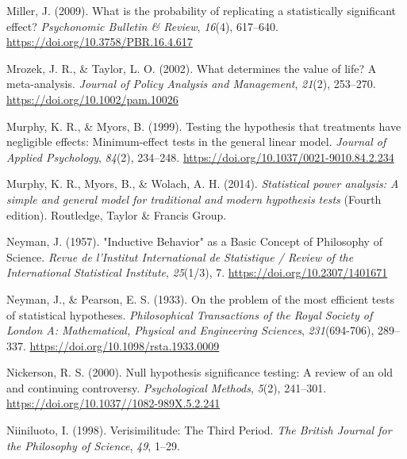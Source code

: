 \documentclass[
  letterpaper,
  DIV=11,
  numbers=noendperiod]{scrreprt}
\newlength{\cslhangindent}
\newlength{\cslentryspacingunit} %
\newenvironment{CSLReferences}[2] %
 {%
  \setlength{\parindent}{0pt}
  \ifodd #1
  \let\oldpar\par
  \def\par{\hangindent=\cslhangindent\oldpar}
  \fi
  \setlength{\parskip}{#2\cslentryspacingunit}
 }%
 {}
\begin{document}
\begin{CSLReferences}{1}{0}
\leavevmode{}%
Miller, J. (2009). What is the probability of replicating a
statistically significant effect? \emph{Psychonomic Bulletin \& Review},
\emph{16}(4), 617--640. \url{https://doi.org/10.3758/PBR.16.4.617}

\leavevmode{}%
Mrozek, J. R., \& Taylor, L. O. (2002). What determines the value of
life? A meta-analysis. \emph{Journal of Policy Analysis and Management},
\emph{21}(2), 253--270. \url{https://doi.org/10.1002/pam.10026}

\leavevmode{}%
Murphy, K. R., \& Myors, B. (1999). Testing the hypothesis that
treatments have negligible effects: {Minimum-effect} tests in the
general linear model. \emph{Journal of Applied Psychology},
\emph{84}(2), 234--248. \url{https://doi.org/10.1037/0021-9010.84.2.234}

\leavevmode{}%
Murphy, K. R., Myors, B., \& Wolach, A. H. (2014). \emph{Statistical
power analysis: A simple and general model for traditional and modern
hypothesis tests} (Fourth edition). {Routledge, Taylor \& Francis
Group}.

\leavevmode{}%
Neyman, J. (1957). "{Inductive Behavior}" as a {Basic Concept} of
{Philosophy} of {Science}. \emph{Revue de l'Institut International de
Statistique / Review of the International Statistical Institute},
\emph{25}(1/3), 7. \url{https://doi.org/10.2307/1401671}

\leavevmode{}%
Neyman, J., \& Pearson, E. S. (1933). On the problem of the most
efficient tests of statistical hypotheses. \emph{Philosophical
Transactions of the Royal Society of London A: Mathematical, Physical
and Engineering Sciences}, \emph{231}(694-706), 289--337.
\url{https://doi.org/10.1098/rsta.1933.0009}

\leavevmode{}%
Nickerson, R. S. (2000). Null hypothesis significance testing: {A}
review of an old and continuing controversy. \emph{Psychological
Methods}, \emph{5}(2), 241--301.
\url{https://doi.org/10.1037//1082-989X.5.2.241}

\leavevmode{}%
Niiniluoto, I. (1998). Verisimilitude: {The Third Period}. \emph{The
British Journal for the Philosophy of Science}, \emph{49}, 1--29.


\end{CSLReferences}
\end{document}
